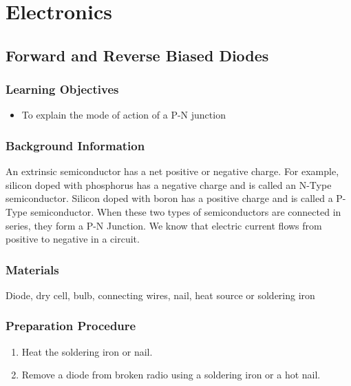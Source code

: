 \section{Electronics}





\subsection{Forward and Reverse Biased Diodes}

\subsubsection*{Learning Objectives}
\begin{itemize}
\item{To explain the mode of action of a P-N junction} 
\end{itemize}

\subsubsection*{Background Information}
An extrinsic semiconductor has a net positive or negative charge. For example, silicon doped with phosphorus has a negative charge and is called an N-Type semiconductor. Silicon doped with boron has a positive charge and is called a P-Type semiconductor. When these two types of semiconductors are connected in series, they form a P-N Junction.  
We know that electric current flows from positive to negative in a circuit.  

\subsubsection*{Materials}
Diode, dry cell, bulb, connecting wires, nail, heat source or soldering iron

\subsubsection*{Preparation Procedure}
\begin{enumerate}
\item{Heat the soldering iron or nail.}
\item{Remove a diode from broken radio using a soldering iron or a hot nail.} 
\end{enumerate}

